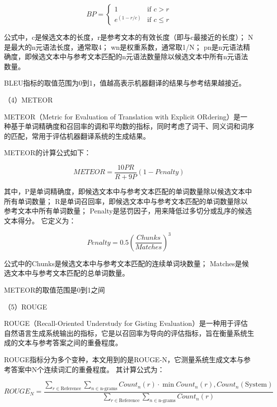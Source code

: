 $$
BP = 
\begin{cases}
1 & \text{if } c > r \\
e^{(1-r/c)} & \text{if } c \leq r
\end{cases}
$$

公式中，c是候选文本的长度，r是参考文本的有效长度（即与c最接近的长度）；
N是最大的n元语法长度，通常取4；
wn是权重系数，通常取1/N；
pn是n元语法精确度，即候选文本中与参考文本匹配的n元语法数量除以候选文本中所有n元语法数量。

BLEU指标的取值范围为0到1，值越高表示机器翻译的结果与参考结果越接近。

（4）METEOR

METEOR（Metric for Evaluation of Translation with Explicit ORdering）是一种基于单词精确度和召回率的调和平均数的指标，同时考虑了词干、同义词和词序的匹配，常用于评估机器翻译系统的生成结果。


METEOR的计算公式如下：

$$METEOR = \frac{10 P R}{R + 9 P} (1 - Penalty)$$

其中，P是单词精确度，即候选文本中与参考文本匹配的单词数量除以候选文本中所有单词数量；
R是单词召回率，即候选文本中与参考文本匹配的单词数量除以参考文本中所有单词数量；
Penalty是惩罚因子，用来降低过多切分或乱序的候选文本得分。
它定义为：

$$Penalty = 0.5 (\frac{Chunks}{Matches})^3$$

公式中的Chunks是候选文本中与参考文本匹配的连续单词块数量；
Matches是候选文本中与参考文本匹配的总单词数量。

METEOR的取值范围是0到1之间


（5）ROUGE

ROUGE（Recall-Oriented Understudy for Gisting Evaluation）是一种用于评估自然语言生成系统输出的指标，它是以召回率为导向的评估指标，旨在衡量系统生成的文本与参考答案之间的重叠程度。

ROUGE指标分为多个变种，本文用到的是ROUGE-N，它测量系统生成文本与参考答案中N个连续词汇的重叠程度。
其计算公式为：

$$ROUGE_{N} = \frac{\sum\limits_{r\in\text{Reference}}\sum\limits_{n\in\text{n-grams}}Count_n(r)\cdot \min{Count_n(r), Count_n(\text{System})}}{\sum\limits_{r\in\text{Reference}}\sum\limits_{n\in\text{n-grams}}Count_n(r)}$$


